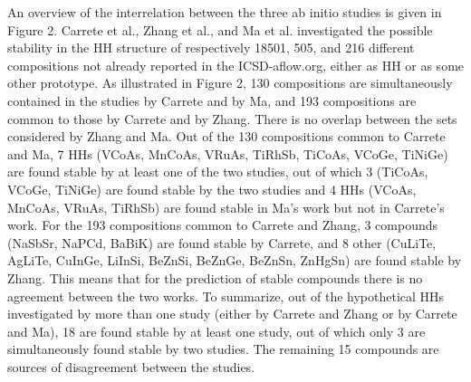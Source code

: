 \documentclass[pt10,journal=jacsat,manuscript=article,layout=twocolumn]{achemso}
\begin{document}
An overview of the interrelation between the three ab initio studies is given in Figure 2. Carrete et al.\cite{FindingUnprecedentedly}, Zhang et al.\cite{SortingStable}, and Ma et al.\cite{Computationalinvestigation} investigated the possible stability in the HH structure of respectively 18501, 505, and 216 different compositions not already reported in the ICSD-aflow.org, either as HH or as some other prototype. As illustrated in Figure 2, 130 compositions are simultaneously contained in the studies
by Carrete and by Ma, and 193 compositions are common to those by Carrete and by Zhang. There is no overlap between the sets considered by Zhang and Ma. Out of the 130 compositions common to Carrete and Ma, 7 HHs (VCoAs, MnCoAs, VRuAs, TiRhSb, TiCoAs, VCoGe, TiNiGe) are found stable by at least one of the two studies, out of which 3 (TiCoAs, VCoGe, TiNiGe) are found stable by the two studies and 4 HHs (VCoAs, MnCoAs, VRuAs, TiRhSb) are found stable in Ma's work but not in Carrete's work. For the 193 compositions common to Carrete and Zhang, 3 compounds (NaSbSr, NaPCd, BaBiK) are found stable by Carrete, and 8 other (CuLiTe, AgLiTe, CuInGe, LiInSi, BeZnSi, BeZnGe, BeZnSn, ZnHgSn) are found stable by Zhang. This means that for the prediction of stable compounds there is no agreement between the two works. To summarize, out of the hypothetical HHs investigated by more than one study (either by Carrete and Zhang or by Carrete and Ma), 18 are found stable by at least one study, out of which only 3 are simultaneously found stable by two studies. The remaining 15 compounds are sources of disagreement between the studies. 
\end{document}
